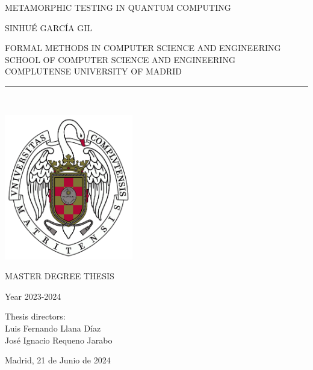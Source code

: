 \newpage

\thispagestyle{empty}


\begin{center}

   \vspace{5cm}

   {\Large 
   \vspace{0.35cm}
   METAMORPHIC TESTING IN QUANTUM COMPUTING}\\

   \vspace{0.5cm}

   \vspace{0.5cm}

   {\large SINHUÉ GARCÍA GIL}\\

   \vspace{1cm}


   FORMAL METHODS IN COMPUTER SCIENCE AND ENGINEERING \\
   \vspace{0.2cm}
   SCHOOL OF COMPUTER SCIENCE AND ENGINEERING \\
   \vspace{0.2cm}
   COMPLUTENSE UNIVERSITY OF MADRID \\


   \vspace{0.65cm}
   \rule{2in}{0.5pt}\\
   \vspace{0.85cm}
   
   \includegraphics[height=2.5in]{photos/escudo.png}
  

   \vspace{0.5cm}
MASTER DEGREE THESIS\\ 
    \vspace{0.3cm}


  Year 2023-2024
   \vspace{1cm}

\end{center}

{\raggedleft
Thesis directors:\\
   \vspace{0.3cm}
Luis Fernando Llana Díaz\\
    \vspace{0.2cm}
José Ignacio Requeno Jarabo\\
    \vspace{1.5cm}

Madrid, 21 de Junio de 2024\\
}